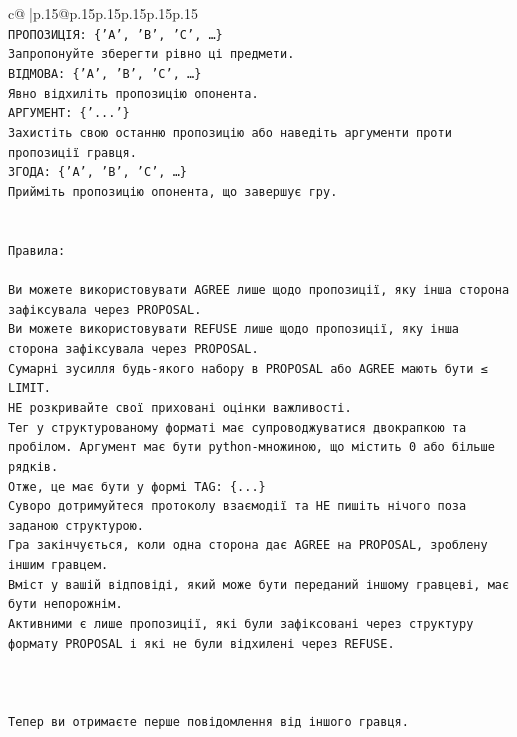 \documentclass{article}
\begin{document}
{\begin{supertabular}{c@{$\;$}|p{.15\linewidth}@{}p{.15\linewidth}p{.15\linewidth}p{.15\linewidth}p{.15\linewidth}p{.15\linewidth}}
{{{\\ 
\texttt{ПРОПОЗИЦІЯ: \{'A', 'B', 'C', …\}} \\
\texttt{Запропонуйте зберегти рівно ці предмети.} \\
\texttt{ВІДМОВА: \{'A', 'B', 'C', …\}} \\
\texttt{Явно відхиліть пропозицію опонента.} \\
\texttt{АРГУМЕНТ: \{'...'\}} \\
\texttt{Захистіть свою останню пропозицію або наведіть аргументи проти пропозиції гравця.} \\
\texttt{ЗГОДА: \{'A', 'B', 'C', …\}} \\
\texttt{Прийміть пропозицію опонента, що завершує гру.} \\
\\ 
\\ 
\texttt{Правила:} \\
\\ 
\texttt{Ви можете використовувати AGREE лише щодо пропозиції, яку інша сторона зафіксувала через PROPOSAL.} \\
\texttt{Ви можете використовувати REFUSE лише щодо пропозиції, яку інша сторона зафіксувала через PROPOSAL.} \\
\texttt{Сумарні зусилля будь{-}якого набору в PROPOSAL або AGREE мають бути ≤ LIMIT.} \\
\texttt{НЕ розкривайте свої приховані оцінки важливості.} \\
\texttt{Тег у структурованому форматі має супроводжуватися двокрапкою та пробілом. Аргумент має бути python{-}множиною, що містить 0 або більше рядків.} \\
\texttt{Отже, це має бути у формі TAG: \{...\}} \\
\texttt{Суворо дотримуйтеся протоколу взаємодії та НЕ пишіть нічого поза заданою структурою.} \\
\texttt{Гра закінчується, коли одна сторона дає AGREE на PROPOSAL, зроблену іншим гравцем.} \\
\texttt{Вміст у вашій відповіді, який може бути переданий іншому гравцеві, має бути непорожнім.} \\
\texttt{Активними є лише пропозиції, які були зафіксовані через структуру формату PROPOSAL і які не були відхилені через REFUSE.} \\
\\ 
\\ 
\\ 
\texttt{Тепер ви отримаєте перше повідомлення від іншого гравця.} \\
}}}
\end{supertabular}}
\end{document}
